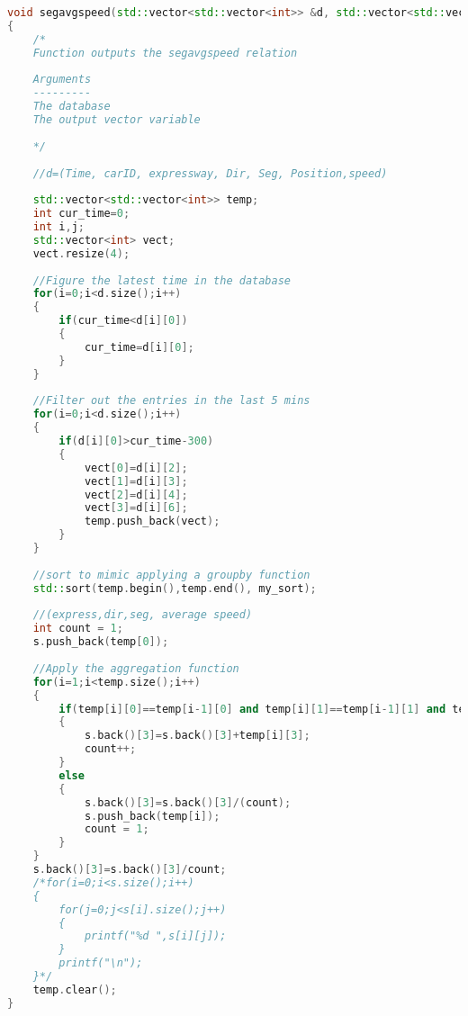 \begin{lstlisting}[language=C++, caption= Calculating the SegAvgSpeed relation, label={lst:SegAvgSpeed}]
void segavgspeed(std::vector<std::vector<int>> &d, std::vector<std::vector<int>> &s)
{
    /*
    Function outputs the segavgspeed relation
    
    Arguments
    ---------
    The database
    The output vector variable
    
    */
    
    //d=(Time, carID, expressway, Dir, Seg, Position,speed)
    
    std::vector<std::vector<int>> temp;
    int cur_time=0;
    int i,j;
    std::vector<int> vect;
    vect.resize(4);
    
    //Figure the latest time in the database
    for(i=0;i<d.size();i++)
    {
        if(cur_time<d[i][0])
        {
            cur_time=d[i][0];
        }
    }
    
    //Filter out the entries in the last 5 mins
    for(i=0;i<d.size();i++)
    {
        if(d[i][0]>cur_time-300)
        {
            vect[0]=d[i][2];
            vect[1]=d[i][3];
            vect[2]=d[i][4];
            vect[3]=d[i][6];
            temp.push_back(vect);
        }
    }
    
    //sort to mimic applying a groupby function
    std::sort(temp.begin(),temp.end(), my_sort);
    
    //(express,dir,seg, average speed)
    int count = 1;
    s.push_back(temp[0]);
    
    //Apply the aggregation function
    for(i=1;i<temp.size();i++)
    {
        if(temp[i][0]==temp[i-1][0] and temp[i][1]==temp[i-1][1] and temp[i][2]==temp[i-1][2])
        {
            s.back()[3]=s.back()[3]+temp[i][3];
            count++;
        }
        else
        {
            s.back()[3]=s.back()[3]/(count);
            s.push_back(temp[i]);
            count = 1;
        }
    }
    s.back()[3]=s.back()[3]/count;
    /*for(i=0;i<s.size();i++)
    {
        for(j=0;j<s[i].size();j++)
        {
            printf("%d ",s[i][j]);
        }
        printf("\n");
    }*/
    temp.clear();
}
\end{lstlisting}
